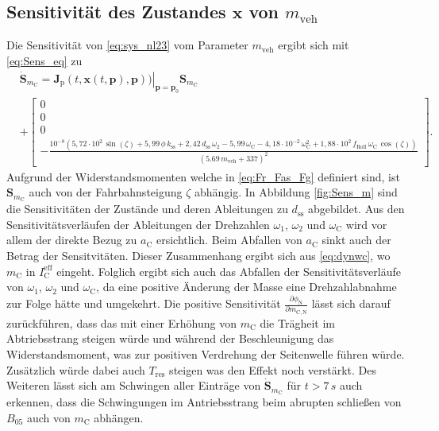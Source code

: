 \subsection{Sensitivität des Zustandes $\pmb{x}$ von $m_\mathrm{veh}$}
Die Sensitivität von \eqref{eq:sys_nl23} vom Parameter $m_\mathrm{veh}$ ergibt sich mit \eqref{eq:Sens_eq} zu
\begin{equation}
\begin{split}
&\dot{\pmb{S}}_{m_\mathrm{C}} = \left. \pmb{J}_\mathrm{p}(t,\pmb{x}(t,\pmb{p}),\pmb{p}))\right|_{\pmb{p}=\pmb{p}_0} \pmb{S}_{m_\mathrm{C}} \\
&+ \begin{bmatrix} 0 \\ 0 \\ 0 \\ -\frac{10^{-8}(5,72\cdot 10^{2}\,\sin(\zeta) + 5,99\,\phi\,k_\mathrm{ss} + 2,42\,d_\mathrm{ss}\,\omega_2 - 5,99\,\omega_\mathrm{C} - 4,18\cdot 10^{-2}\,\omega_\mathrm{C}^2 + 1,88\cdot 10^{2}\,f_\mathrm{Roll}\,\omega_\mathrm{C}\,\cos(\zeta))}{(5.69\,m_\mathrm{veh} + 337)^2}\end{bmatrix}.
\end{split}
\end{equation}
Aufgrund der Widerstandsmomenten welche in \eqref{eq:Fr_Fas_Fg} definiert sind, ist $\pmb{S}_{m_\mathrm{C}}$ auch von der Fahrbahnsteigung $\zeta$ abhängig. In Abbildung \ref{fig:Sens_m} sind die Sensitivitäten der Zustände und deren Ableitungen zu $d_\mathrm{ss}$ abgebildet. Aus den Sensitivitätsverläufen der Ableitungen der Drehzahlen $\omega_1$, $\omega_2$ und $\omega_\mathrm{C}$ wird vor allem der direkte Bezug zu $a_\mathrm{C}$ ersichtlich. Beim Abfallen von $a_\mathrm{C}$ sinkt auch der Betrag der Sensitvitäten. Dieser Zusammenhang ergibt sich aus \eqref{eq:dynwc}, wo $m_\mathrm{C}$ in $I_\mathrm{C}^\mathrm{eff}$ eingeht. Folglich ergibt sich auch das Abfallen der Sensitivitätsverläufe von $\omega_1$, $\omega_2$ und $\omega_\mathrm{C}$, da eine positive Änderung der Masse eine Drehzahlabnahme zur Folge hätte und umgekehrt. Die positive Sensitivität $\frac{\partial \phi_\mathrm{N}}{\partial m_\mathrm{C,N}}$ lässt sich darauf zurückführen, dass das mit einer Erhöhung von $m_\mathrm{C}$ die Trägheit im Abtriebsstrang steigen würde und während der Beschleunigung das Widerstandsmoment, was zur positiven Verdrehung der Seitenwelle führen würde. Zusätzlich würde dabei auch $T_\mathrm{res}$ steigen was den Effekt noch verstärkt. Des Weiteren lässt sich am Schwingen aller Einträge von $\dot{\pmb{S}}_{m_\mathrm{C}}$ für $t>7\, s$ auch erkennen, dass die Schwingungen im Antriebsstrang beim abrupten schließen von $B_{05}$ auch von $m_\mathrm{C}$ abhängen.

